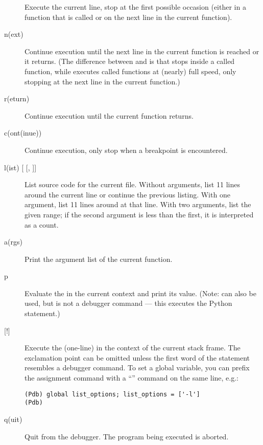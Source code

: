 \begin{description}
Execute the current line, stop at the first possible occasion
(either in a function that is called or on the next line in the
current function).

\item[{n(ext)}]

Continue execution until the next line in the current function
is reached or it returns.  (The difference between  and
 is that  stops inside a called function, while
 executes called functions at (nearly) full speed, only
stopping at the next line in the current function.)

\item[{r(eturn)}]

Continue execution until the current function returns.

\item[{c(ont(inue))}]

Continue execution, only stop when a breakpoint is encountered.

\item[{l(ist) [\var{first} [, \var{last}]]}]

List source code for the current file.  Without arguments, list 11
lines around the current line or continue the previous listing.  With
one argument, list 11 lines around at that line.  With two arguments,
list the given range; if the second argument is less than the first,
it is interpreted as a count.

\item[{a(rgs)}]

Print the argument list of the current function.

\item[{p \var{expression}}]

Evaluate the  in the current context and print its
value.  (Note:  can also be used, but is not a debugger
command --- this executes the Python  statement.)

\item[{[!] \var{statement}}]

Execute the (one-line)  in the context of
the current stack frame.
The exclamation point can be omitted unless the first word
of the statement resembles a debugger command.
To set a global variable, you can prefix the assignment
command with a ``'' command on the same line, e.g.:
\begin{verbatim}
(Pdb) global list_options; list_options = ['-l']
(Pdb)
\end{verbatim}

\item[{q(uit)}]

Quit from the debugger.
The program being executed is aborted.

\end{description}
